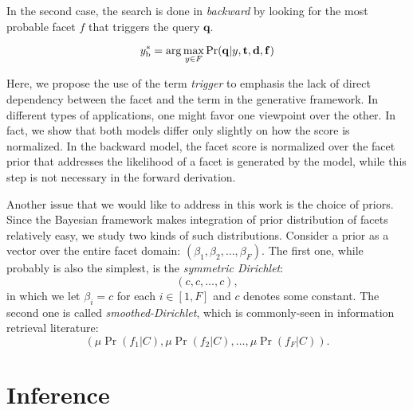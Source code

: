In the second case, the search is done in \emph{backward} by looking for the
most probable facet $f$ that triggers the query $\mathbf{q}$.

\begin{equation}y^*_{\rm b} = \arg\max_{y \in F} \Pr(\mathbf{q}|y, \mathbf{t},
\mathbf{d}, \mathbf{f}) \label{eq:backward} \end{equation}

Here, we propose the use of the term \emph{trigger} to emphasis the lack of
direct dependency between the facet and the term in the generative framework.
In different types of applications, one might favor one viewpoint over the
other.  In fact, we show that both models differ only slightly on how the score
is normalized.  In the backward model, the facet score is normalized over the
facet prior that addresses the likelihood of a facet is generated by the model,
while this step is not necessary in the forward derivation.

Another issue that we would like to address in this work is the choice of
priors.  Since the Bayesian framework makes integration of prior distribution
of facets relatively easy, we study two kinds of such distributions.  Consider
a prior as a vector over the entire facet domain: $(\beta_1, \beta_2, \ldots,
\beta_F)$.  The first one, while probably is also the simplest, is the
\emph{symmetric Dirichlet}: \[ (c, c, \ldots, c), \] in which we let $\beta_i = c$ for
each $i \in [1, F]$ and $c$ denotes some constant.  The second one is called
\emph{smoothed-Dirichlet}, which is commonly-seen in information retrieval
literature: \[ (\mu \Pr(f_1|C), \mu \Pr(f_2|C), \ldots, \mu \Pr(f_F|C)). \]

\section{Inference}

